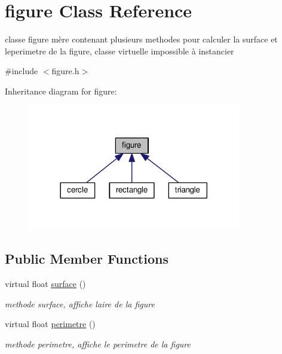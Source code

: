 \hypertarget{classfigure}{}\section{figure Class Reference}
\label{classfigure}


classe figure mère contenant plusieurs methodes pour calculer la surface et leperimetre de la figure, classe virtuelle impossible à instancier  




{\ttfamily \#include $<$figure.\+h$>$}



Inheritance diagram for figure\+:\nopagebreak
\begin{figure}[H]
\begin{center}
\leavevmode
\includegraphics[width=264pt]{classfigure__inherit__graph}
\end{center}
\end{figure}
\subsection*{Public Member Functions}
\begin{DoxyCompactItemize}
\item 
virtual float \hyperlink{classfigure_ae301cacba1033c35834008e63ef103e8}{surface} ()\hypertarget{classfigure_ae301cacba1033c35834008e63ef103e8}{}\label{classfigure_ae301cacba1033c35834008e63ef103e8}

\begin{DoxyCompactList}\small\item\em methode surface, affiche l\textquotesingle{}aire de la figure \end{DoxyCompactList}\item 
virtual float \hyperlink{classfigure_aa17af226caeac91d8a3f67276bcbd2b6}{perimetre} ()\hypertarget{classfigure_aa17af226caeac91d8a3f67276bcbd2b6}{}\label{classfigure_aa17af226caeac91d8a3f67276bcbd2b6}

\begin{DoxyCompactList}\small\item\em methode perimetre, affiche le perimetre de la figure \end{DoxyCompactList}\end{DoxyCompactItemize}


